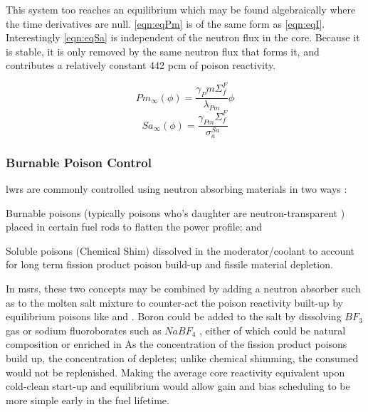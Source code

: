 This system too reaches an equilibrium which may be found algebraically where the time derivatives are null. \ref{eqn:eqPm} is of the same form as \ref{eqn:eqI}. Interestingly \ref{eqn:eqSa} is independent of the neutron flux in the core. Because it is stable, it is only removed by the same neutron flux that forms it, and contributes a relatively constant 442 pcm of poison reactivity. 

\begin{equation}\label{eqn:eqPm}
    Pm_{\infty}(\phi) = \frac{\gamma_Pm \Sigma_f^F }{\lambda_{Pm}}\phi
\end{equation}
\begin{equation}\label{eqn:eqSa}
    Sa_{\infty}(\phi) = \frac{\gamma_{Pm} \Sigma_f^F }{\sigma_a^{Sa}}
\end{equation}

\subsubsection{Burnable Poison Control}
\acsp{lwr} are commonly controlled using neutron absorbing materials in two ways \cite[Ch. 8]{Kerlin}:
\begin{enumerate*}
    \item Burnable poisons (typically poisons who's daughter are neutron-transparent \cite[Ch. 14]{DH}) placed in certain fuel rods to flatten the power profile; and 
    \item Soluble poisons (\ie Chemical Shim) dissolved in the moderator/coolant to account for long term fission product poison build-up and fissile material depletion.
\end{enumerate*}
In \acsp{msr}, these two concepts may be combined by adding a neutron absorber such as \B[10] to the molten salt mixture to counter-act the poison reactivity built-up by equilibrium poisons like \Xe and \Sa. Boron could be added to the salt by dissolving $BF_3$ gas \cite{BF3} or sodium fluoroborates such as $NaBF_4$ \cite{ORNL-BoronHastelloy}, either of which could be natural composition or enriched in \B[10] As the concentration of the fission product poisons build up, the concentration of \B[10] depletes; unlike chemical shimming, the consumed \B[10] would not be replenished. Making the average core reactivity equivalent upon cold-clean start-up and equilibrium would allow gain and bias scheduling to be more simple early in the fuel lifetime.

